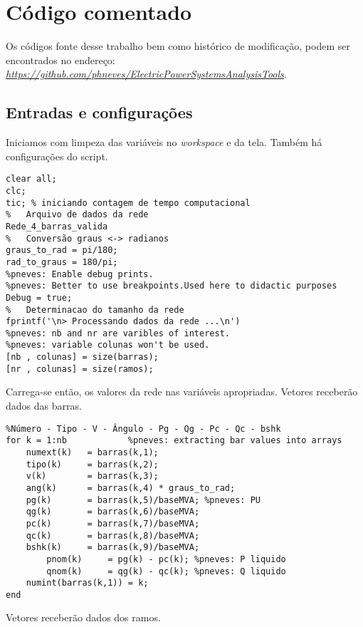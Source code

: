 \chapter{C\'odigo comentado}
\label{SectionCodigo}

Os códigos fonte desse trabalho bem como histórico de modificação, podem ser encontrados no endereço: \textit{\href{https://github.com/phneves/ElectricPowerSystemsAnalysisTools}{https://github.com/phneves/ElectricPowerSystemsAnalysisTools}}.
\section{Entradas e configurações}
Iniciamos com limpeza das variáveis no \textit{workspace} e da tela. Também há configurações do script.
\begin{verbatim}
clear all;
clc;
tic; % iniciando contagem de tempo computacional
%   Arquivo de dados da rede
Rede_4_barras_valida
%   Conversão graus <-> radianos
graus_to_rad = pi/180;
rad_to_graus = 180/pi;
%pneves: Enable debug prints.
%pneves: Better to use breakpoints.Used here to didactic purposes
Debug = true;
%	Determinacao do tamanho da rede
fprintf('\n> Processando dados da rede ...\n')
%pneves: nb and nr are varibles of interest.
%pneves: variable colunas won't be used. 
[nb , colunas] = size(barras);
[nr , colunas] = size(ramos);
\end{verbatim}
Carrega-se então, os valores da rede nas variáveis apropriadas. Vetores receberão dados das barras.
\begin{verbatim}
%Número - Tipo - V - Ângulo - Pg - Qg - Pc - Qc - bshk
for k = 1:nb            %pneves: extracting bar values into arrays
    numext(k)   = barras(k,1);                  
    tipo(k)     = barras(k,2);                  
    v(k)        = barras(k,3);                  
    ang(k)      = barras(k,4) * graus_to_rad;   
    pg(k)       = barras(k,5)/baseMVA; %pneves: PU 
    qg(k)       = barras(k,6)/baseMVA;
    pc(k)       = barras(k,7)/baseMVA;
    qc(k)       = barras(k,8)/baseMVA;
    bshk(k)     = barras(k,9)/baseMVA;
        pnom(k)     = pg(k) - pc(k); %pneves: P liquido
        qnom(k)     = qg(k) - qc(k); %pneves: Q liquido
    numint(barras(k,1)) = k;
end
\end{verbatim}
Vetores receberão dados dos ramos.
